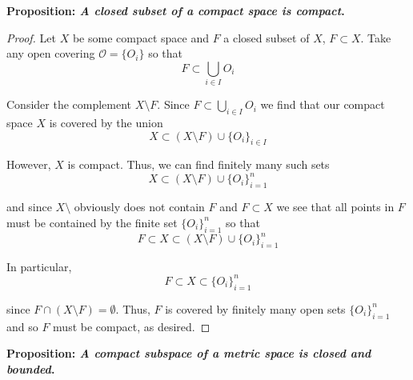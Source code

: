 \documentclass[12pt]{article}
\newlength\tindent
\renewcommand{\indent}{\hspace*{\tindent}}
\begin{document}
%
% 
{\bf Proposition: {\em A closed subset of a compact space is compact}.} 

\begin{proof} Let $X$ be some compact space and $F$ a closed subset of $X$, $F \subset X$. Take any open covering $\mathcal O = \{O_i\}$ so that
\begin{equation*}
	F \subset \bigcup_{i \in I} O_i
\end{equation*}

\indent Consider the complement $X\setminus F$. Since $F \subset \bigcup_{i \in I} O_i$ we find that our compact space $X$ is covered by the union
\begin{equation*}
	X \subset \left(X\setminus F\right) \cup \{O_i\}_{i\in I}
\end{equation*}

However, $X$ is compact. Thus, we can find finitely many such sets
\begin{equation*}
	X \subset \left(X\setminus F\right) \cup \{O_i\}^n_{i = 1}
\end{equation*}

and since $X\setminus$ obviously does not contain $F$ and $F\subset X$ we see that all points in $F$ must be contained by the finite set $\{O_i\}^n_{i = 1}$ so that
\begin{equation*}
	F \subset X \subset \left(X\setminus F\right) \cup \{O_i\}^n_{i = 1}
\end{equation*}

In particular,
\begin{equation*}
	F \subset X \subset \{O_i\}^n_{i = 1}
\end{equation*}

since $F \cap \left(X\setminus F\right) = \emptyset$. Thus, $F$ is covered by finitely many open sets $\{O_i\}^n_{i = 1}$ and so $F$ must be compact, as desired.
\end{proof}

%
%
{\bf Proposition: {\em A compact subspace of a metric space is closed and bounded}.}
\end{document}

